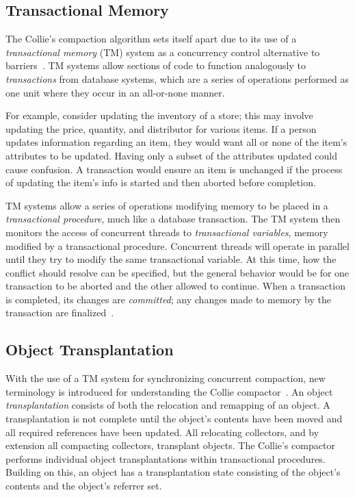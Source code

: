 \documentclass{sig-alternate}
\begin{document}
\subsection{Transactional Memory}
\label{sec:collieTM}

The Collie's compaction algorithm sets itself apart due to its use 
of a \emph{transactional memory} (TM) system as a concurrency control 
alternative to barriers~\cite{Iyengar:Collie}. TM systems allow
sections of code to function 
analogously to \emph{transactions} from database systems, 
which are a series of operations performed as one unit where 
they occur in an all-or-none manner.

For example, consider updating the inventory of a store; this may involve updating
the price, quantity, and distributor for various items. 
If a person updates information regarding an item, they would 
want all or none of the item's attributes to be updated. Having
only a subset of the attributes updated could cause confusion. A transaction
would ensure an item is unchanged if the process of updating the item's info 
is started and then aborted before completion.

TM systems allow a series
of operations modifying memory to be placed in
a \emph{transactional procedure}, much like a database transaction.
The TM system then monitors the access of concurrent threads to \emph{transactional variables},
memory modified by a transactional procedure.
Concurrent threads will operate in parallel until they try to modify
the same transactional variable. At this time, how 
the conflict should resolve can be specified, but the general behavior would be for one transaction
to be aborted and the other allowed to continue.
When a transaction is completed, its changes are \emph{committed}; any changes 
made to memory by the transaction are finalized~\cite{wiki:transactional-memory}.


\subsection{Object Transplantation}
\label{sec:collieTransplantation}

With the use of a TM system for synchronizing concurrent compaction,
new terminology is introduced for understanding the Collie 
compactor~\cite{Iyengar:Collie}. 
An object \emph{transplantation} consists of both the relocation and 
remapping of an object. A transplantation is not complete until
the object's contents have been moved and all required references have been
updated. All relocating collectors, and by extension all
compacting collectors, transplant objects. The Collie's compactor 
performs individual object transplantations within transactional procedures. 
Building on this, an object has a transplantation state consisting of the object's contents 
and the object's referrer set.
\end{document}
